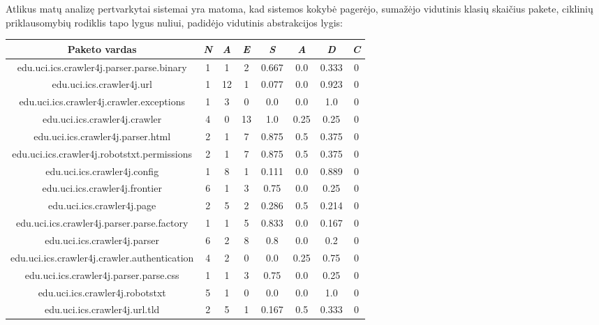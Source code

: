 Atlikus matų analizę pertvarkytai sistemai yra matoma, kad sistemos kokybė pagerėjo,
sumažėjo vidutinis klasių skaičius pakete, ciklinių priklausomybių rodiklis tapo lygus nuliui,
padidėjo vidutinis abstrakcijos lygis:
\begin{center}
    \begin{tabular}{|c|c|c|c|c|c|c|c|}
        \hline
        Paketo vardas & \textit{N} & \textit{A} & \textit{E} & \textit{S} & \textit{A} & \textit{D} & \textit{C} \\ [0.5ex]
        \hline\hline
        edu.uci.ics.crawler4j.parser.parse.binary & 1 & 1 & 2 & 0.667 & 0.0 & 0.333 & 0\\
        \hline
        edu.uci.ics.crawler4j.url & 1 & 12 & 1 & 0.077 & 0.0 & 0.923 & 0\\
        \hline
        edu.uci.ics.crawler4j.crawler.exceptions & 1 & 3 & 0 & 0.0 & 0.0 & 1.0 & 0 \\
        \hline
        edu.uci.ics.crawler4j.crawler & 4 & 0 & 13 & 1.0 & 0.25 & 0.25 & 0  \\
        \hline
        edu.uci.ics.crawler4j.parser.html & 2 & 1 & 7 & 0.875 & 0.5 & 0.375 & 0 \\
        \hline
        edu.uci.ics.crawler4j.robotstxt.permissions & 2 & 1 & 7 & 0.875 & 0.5 & 0.375 & 0\\
        \hline
        edu.uci.ics.crawler4j.config & 1 & 8 & 1 & 0.111 & 0.0 & 0.889 & 0 \\
        \hline
        edu.uci.ics.crawler4j.frontier & 6 & 1 & 3 & 0.75 & 0.0 & 0.25 & 0  \\
        \hline
        edu.uci.ics.crawler4j.page & 2 & 5 & 2 & 0.286 & 0.5 & 0.214 & 0 \\
        \hline
        edu.uci.ics.crawler4j.parser.parse.factory & 1 & 1 & 5 & 0.833 & 0.0 & 0.167 & 0 \\
        \hline
        edu.uci.ics.crawler4j.parser & 6 & 2 & 8 & 0.8 & 0.0 & 0.2 &0 \\
        \hline
        edu.uci.ics.crawler4j.crawler.authentication & 4 & 2 & 0 & 0.0 & 0.25 & 0.75 & 0 \\
        \hline
        edu.uci.ics.crawler4j.parser.parse.css & 1 & 1 & 3 & 0.75 & 0.0 & 0.25 & 0\\
        \hline
        edu.uci.ics.crawler4j.robotstxt & 5 & 1 & 0 & 0.0 & 0.0 & 1.0 & 0 \\
        \hline
        edu.uci.ics.crawler4j.url.tld & 2 & 5 & 1 & 0.167 & 0.5 & 0.333 & 0 \\
        \hline

\end{tabular}
\end{center}
